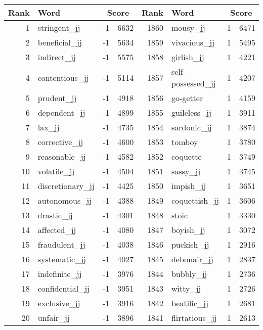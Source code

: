 \begin{table}[tbp]
    \begin{tabular}{| rlr@{.}l | rlr@{.}l |}
    \hline
    \textbf{Rank} & \textbf{Word} & \multicolumn{2}{c|}{\textbf{Score}} & \textbf{Rank} & \textbf{Word} & \multicolumn{2}{c|}{\textbf{Score}} \\
    \hline
    1 & stringent\_jj & -1 & 6632    &    1860 & mousy\_jj & 1 & 6471 \\
    2 & beneficial\_jj & -1 & 5634    &    1859 & vivacious\_jj & 1 & 5495 \\
    3 & indirect\_jj & -1 & 5575    &    1858 & girlish\_jj & 1 & 4221 \\
    4 & contentious\_jj & -1 & 5114    &    1857 & self-possessed\_jj & 1 & 4207 \\
    5 & prudent\_jj & -1 & 4918    &    1856 & go-getter & 1 & 4159 \\
    6 & dependent\_jj & -1 & 4899    &    1855 & guileless\_jj & 1 & 3911 \\
    7 & lax\_jj & -1 & 4735    &    1854 & sardonic\_jj & 1 & 3874 \\
    8 & corrective\_jj & -1 & 4600    &    1853 & tomboy & 1 & 3780 \\
    9 & reasonable\_jj & -1 & 4582    &    1852 & coquette & 1 & 3749 \\
    10 & volatile\_jj & -1 & 4504    &    1851 & sassy\_jj & 1 & 3745 \\
    11 & discretionary\_jj & -1 & 4425    &    1850 & impish\_jj & 1 & 3651 \\
    12 & autonomous\_jj & -1 & 4388    &    1849 & coquettish\_jj & 1 & 3606 \\
    13 & drastic\_jj & -1 & 4301    &    1848 & stoic & 1 & 3330 \\
    14 & affected\_jj & -1 & 4080    &    1847 & boyish\_jj & 1 & 3072 \\
    15 & fraudulent\_jj & -1 & 4038    &    1846 & puckish\_jj & 1 & 2916 \\
    16 & systematic\_jj & -1 & 4027    &    1845 & debonair\_jj & 1 & 2837 \\
    17 & indefinite\_jj & -1 & 3976    &    1844 & bubbly\_jj & 1 & 2736 \\
    18 & confidential\_jj & -1 & 3951    &    1843 & witty\_jj & 1 & 2726 \\
    19 & exclusive\_jj & -1 & 3916    &    1842 & beatific\_jj & 1 & 2681 \\
    20 & unfair\_jj & -1 & 3896    &    1841 & flirtatious\_jj & 1 & 2613 \\

\end{tabular}
\end{table}
